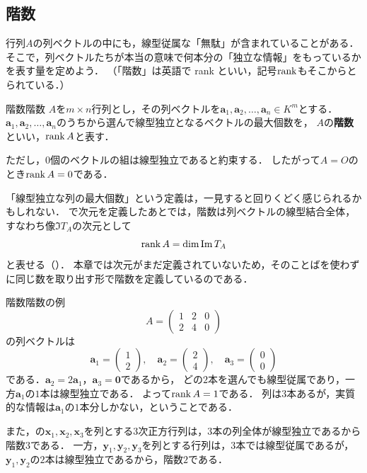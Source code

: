 \subsection{階数}

行列$A$の列ベクトルの中にも，線型従属な「無駄」が含まれていることがある．
そこで，列ベクトルたちが本当の意味で何本分の「独立な情報」をもっているかを表す量を定めよう．
（「階数」は英語で rank といい，記号$\operatorname{rank}$もそこからとられている．）

\begin{definition}{階数}{階数}
  $A$を$m \times n$行列とし，その列ベクトルを$\bm{a}_1, \bm{a}_2, \dots, \bm{a}_n \in K^m$とする．
  $\bm{a}_1, \bm{a}_2, \dots, \bm{a}_n$のうちから選んで線型独立となるベクトルの最大個数を，
  $A$の\textbf{階数}といい，$\operatorname{rank} A$と表す．

  ただし，$0$個のベクトルの組は線型独立であると約束する．
  したがって$A = O$のとき$\operatorname{rank} A = 0$である．
\end{definition}

「線型独立な列の最大個数」という定義は，一見すると回りくどく感じられるかもしれない．
で次元を定義したあとでは，階数は列ベクトルの線型結合全体，すなわち像$\Im T_A$の次元として
\[
  \operatorname{rank} A = \dim \operatorname{Im} T_A
\]
と表せる（）．
本章では次元がまだ定義されていないため，そのことばを使わずに同じ数を取り出す形で階数を定義しているのである．

\begin{example}{階数}{階数の例}
  \[
    A = \begin{pmatrix} 1 & 2 & 0 \\ 2 & 4 & 0 \end{pmatrix}
  \]
  の列ベクトルは
  \[
    \bm{a}_1 = \begin{pmatrix} 1 \\ 2 \end{pmatrix}, \quad
    \bm{a}_2 = \begin{pmatrix} 2 \\ 4 \end{pmatrix}, \quad
    \bm{a}_3 = \begin{pmatrix} 0 \\ 0 \end{pmatrix}
  \]
  である．$\bm{a}_2 = 2\bm{a}_1$，$\bm{a}_3 = \bm{0}$であるから，
  どの$2$本を選んでも線型従属であり，一方$\bm{a}_1$の$1$本は線型独立である．
  よって$\operatorname{rank} A = 1$である．
  列は$3$本あるが，実質的な情報は$\bm{a}_1$の$1$本分しかない，ということである．

  また，の$\bm{x}_1, \bm{x}_2, \bm{x}_3$を列とする$3$次正方行列は，$3$本の列全体が線型独立であるから階数$3$である．
  一方，$\bm{y}_1, \bm{y}_2, \bm{y}_3$を列とする行列は，$3$本では線型従属であるが，$\bm{y}_1,\bm{y}_2$の$2$本は線型独立であるから，階数$2$である．
\end{example}

